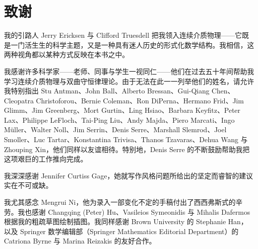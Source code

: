 \documentclass[../../main.tex]{subfiles}
\begin{document}

\chapter*{致谢}
\label{chapter:front-acknowledgments}

我的引路人 Jerry Ericksen 与 Clifford Truesdell 把我领入连续介质物理——它既是一门活生生的科学主题，又是一种具有迷人历史的形式化数学结构。我相信，这两种视角都以某种方式反映在本书之中。

我感谢许多科学家——老师、同事与学生一视同仁——他们在过去五十年间帮助我学习连续介质物理与双曲守恒律理论。由于无法在此一一列举他们的姓名，请允许我特别指出 Stu Antman、John Ball、Alberto Bressan、Gui-Qiang Chen、Cleopatra Christoforou、Bernie Coleman、Ron DiPerna、Hermano Frid、Jim Glimm、Jim Greenberg、Mort Gurtin、Ling Hsiao、Barbara Keyfitz、Peter Lax、Philippe LeFloch、Tai-Ping Liu、Andy Majda、Piero Marcati、Ingo Müller、Walter Noll、Jim Serrin、Denis Serre、Marshall Slemrod、Joel Smoller、Luc Tartar、Konstantina Trivisa、Thanos Tzavaras、Dehua Wang 与 Zhouping Xin，他们同样以友谊相待。特别地，Denis Serre 的不断鼓励帮助我把这项艰巨的工作推向完成。

我深深感谢 Jennifer Curtiss Gage，她就写作风格问题所给出的坚定而睿智的建议实在不可或缺。

我尤其感念 Mengrui Ni，他为录入一部变化不定的手稿付出了西西弗斯式的辛劳。我也感谢 Changqing (Peter) Hu、Vasileios Symeonidis 与 Mihalis Dafermos 根据我的粗疏草图绘制插图。我同样感谢 Brown University 的 Stephanie Han，以及 Springer 数学编辑部（Springer Mathematics Editorial Department）的 Catriona Byrne 与 Marina Reizakis 的友好合作。
\end{document}
